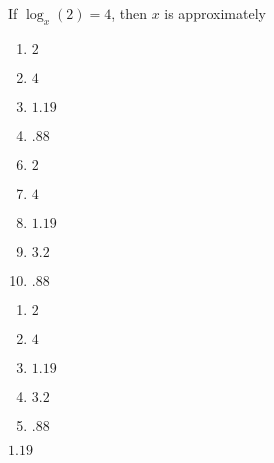 



  If $\log_{x}(2) = 4$, then $x$ is approximately


\ifsat
	\begin{enumerate}[label=\Alph*)]
		\item    $2$
		\item  $4$
		\item  $1.19$%
		\item   $.88$
	\end{enumerate}
\else
\fi

\ifacteven
	\begin{enumerate}[label=\textbf{\Alph*.},itemsep=\fill,align=left]
		\setcounter{enumii}{5}
		\item    $2$
		\item  $4$
		\item  $1.19$%
		\addtocounter{enumii}{1}
		\item  $3.2$
		\item   $.88$
	\end{enumerate}
\else
\fi

\ifactodd
	\begin{enumerate}[label=\textbf{\Alph*.},itemsep=\fill,align=left]
		\item    $2$
		\item  $4$
		\item  $1.19$%
		\item  $3.2$
		\item   $.88$
	\end{enumerate}
\else
\fi

\ifgridin
  $1.19$%
		
\else
\fi

